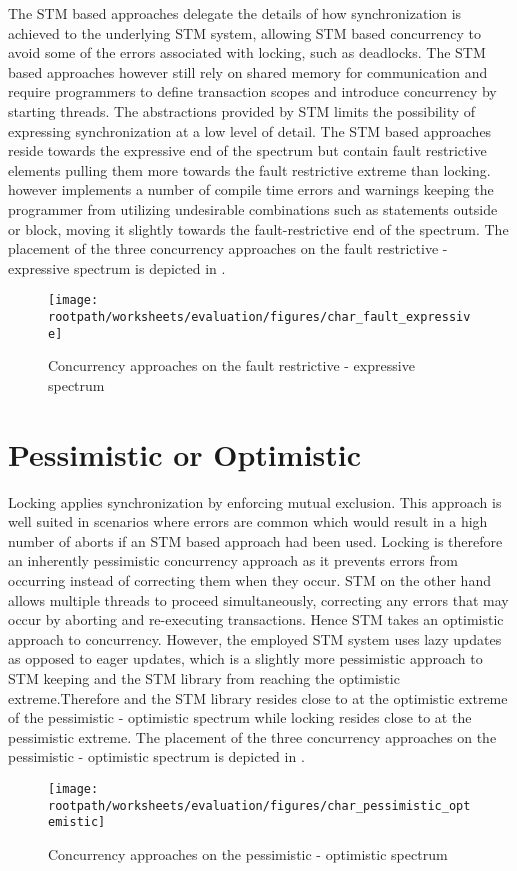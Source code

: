 The \ac{STM} based approaches delegate the details of how synchronization is achieved to the underlying \ac{STM} system, allowing \ac{STM} based concurrency to avoid some of the errors associated with locking, such as deadlocks. The \ac{STM} based approaches however still rely on shared memory for communication and require programmers to define transaction scopes and introduce concurrency by starting threads. The abstractions provided by \ac{STM} limits the possibility of expressing synchronization at a low level of  detail. The \ac{STM} based approaches reside towards the expressive end of the spectrum but contain fault restrictive elements pulling them more towards the fault restrictive extreme than locking. \stmname however implements a number of compile time errors and warnings keeping the programmer from utilizing undesirable combinations such as  statements outside  or  block, moving it slightly towards the fault-restrictive end of the spectrum. The placement of the three concurrency approaches on the fault restrictive - expressive spectrum is depicted in .
\begin{figure}[htbp]
\centering
\texttt{[image: \\rootpath/worksheets/evaluation/figures/char\_fault\_expressive]}
\caption{Concurrency approaches on the fault restrictive - expressive spectrum}
\label{fig:char_fault_expressive}
\end{figure}

\section{Pessimistic or Optimistic}
Locking applies synchronization by enforcing mutual exclusion. This approach is well suited in scenarios where errors are common which would result in a high number of aborts if an \ac{STM} based approach had been used. Locking is therefore an inherently pessimistic concurrency approach as it prevents errors from occurring instead of correcting them when they occur. \ac{STM} on the other hand allows multiple threads to proceed simultaneously, correcting any errors that may occur by aborting and re-executing transactions. Hence \ac{STM} takes an optimistic approach to concurrency. However, the employed \ac{STM} system uses lazy updates as opposed to eager updates, which is a slightly more pessimistic approach to \ac{STM} keeping \stmnamesp and the \ac{STM} library from reaching the optimistic extreme.Therefore \stmnamesp and the \ac{STM} library resides close to at the optimistic extreme of the pessimistic - optimistic spectrum while locking resides close to at the pessimistic extreme. The placement of the three concurrency approaches on the pessimistic - optimistic spectrum is depicted in .
\begin{figure}[htbp]
\centering
\texttt{[image: \\rootpath/worksheets/evaluation/figures/char\_pessimistic\_optemistic]}
\caption{Concurrency approaches on the pessimistic - optimistic spectrum}
\label{fig:char_pes_opti}
\end{figure}

